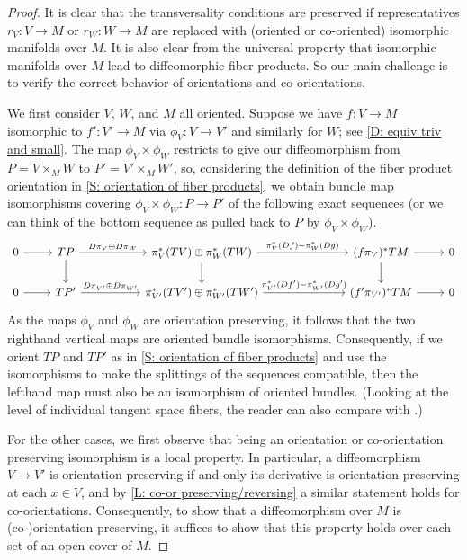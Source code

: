 \begin{proof}
	It is clear that the transversality conditions are preserved if representatives $r_V \colon V \to M$ or $r_W \colon W \to M$ are replaced with (oriented or co-oriented) isomorphic manifolds over $M$.
	It is also clear from the universal property that isomorphic manifolds over $M$ lead to diffeomorphic fiber products.
	So our main challenge is to verify the correct behavior of orientations and co-orientations.

	We first consider $V$, $W$, and $M$ all oriented.
	Suppose we have $f \colon V \to M$ isomorphic to $f' \colon V' \to M$ via $\phi_V \colon V \to V'$ and similarly for $W$; see \cref{D: equiv triv and small}.
	The map $\phi_V \times \phi_W$ restricts to give our diffeomorphism from $P = V \times_M W$ to $P' = V' \times_M W'$, so, considering the definition of the fiber product orientation in \cref{S: orientation of fiber products}, we obtain bundle map isomorphisms covering $\phi_V \times \phi_W \colon P \to P'$ of the following exact sequences (or we can think of the bottom sequence as pulled back to $P$ by $\phi_V \times \phi_W$).
	\begin{equation}
		\begin{tikzcd}
			0 \arrow[r] & TP \arrow[r,"D\pi_V \oplus D\pi_W"] \arrow[d] &[1cm] \pi_V^*(TV) \oplus \pi_W^*(TW) \arrow[r,"\pi_V^*(Df)-\pi_W^*(Dg)"] \arrow[d] &[1.7cm] (f\pi_V)^*TM \arrow[r] \arrow[d] & 0 \\
			0 \arrow[r] & TP' \arrow[r,"D\pi_{V'} \oplus D\pi_{W'}"] & \pi_{V'}^*(TV') \oplus \pi_{W'}^*(TW') \arrow[r,"\pi_{V'}^*(Df')-\pi_{W'}^*(Dg')"] & (f'\pi_{V'})^*TM \arrow[r] & 0
		\end{tikzcd}
	\end{equation}
	As the maps $\phi_V$ and $\phi_W$ are orientation preserving, it follows that the two righthand vertical maps are oriented bundle isomorphisms.
	Consequently, if we orient $TP$ and $TP'$ as in \cref{S: orientation of fiber products} and use the isomorphisms to make the splittings of the sequences compatible, then the lefthand map must also be an isomorphism of oriented bundles.
	(Looking at the level of individual tangent space fibers, the reader can also compare with \cite[Sections 9.1.1 and 9.3.1]{RamBas09}.)

	For the other cases, we first observe that being an orientation or co-orientation preserving isomorphism is a local property.
	In particular, a diffeomorphism $V \to V'$ is orientation preserving if and only its derivative is orientation preserving at each $x \in V$, and by \cref{L: co-or preserving/reversing} a similar statement holds for co-orientations.
	Consequently, to show that a diffeomorphism over $M$ is (co-)orientation preserving, it suffices to show that this property holds over each set of an open cover of $M$.


\end{proof}
